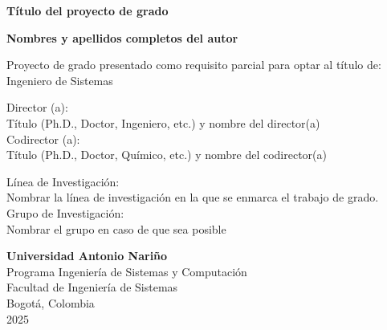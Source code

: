 \begin{titlepage}
    \begin{center}
        \vspace*{1cm}

        \Huge
        \textbf{Título del proyecto de grado}
 
        \vfill
        
        \large
        \textbf{Nombres y apellidos completos del autor}\\
 
        \vfill

        Proyecto de grado presentado como requisito parcial para optar al título de:\\
        Ingeniero de Sistemas\\

        \vfill

        Director (a):\\
        Título (Ph.D., Doctor, Ingeniero, etc.) y nombre del director(a)\\
        Codirector (a):\\
        Título (Ph.D., Doctor, Químico, etc.) y nombre del codirector(a)\\

        \vfill

        Línea de Investigación:\\
        Nombrar la línea de investigación en la que se enmarca el trabajo de grado.\\
        Grupo de Investigación:\\
        Nombrar el grupo en caso de que sea posible\\

             
        \vspace{0.8cm}
             
        \textbf{Universidad Antonio Nariño}\\
        Programa Ingeniería de Sistemas y Computación\\
        Facultad de Ingeniería de Sistemas\\
        Bogotá, Colombia\\
        2025
    \end{center}
\end{titlepage}
